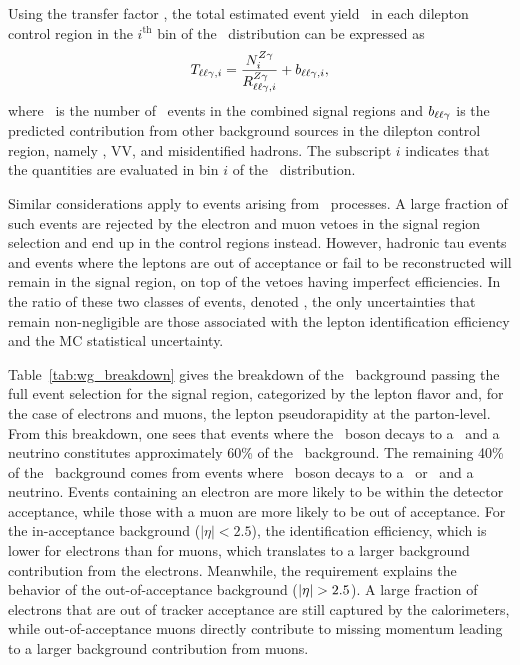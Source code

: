 Using the transfer factor \RZll, the total estimated event yield \Tll\ in each dilepton control region in the $i^\mathrm{th}$ bin of the \ETg\ distribution can be expressed as
\begin{equation}
  \Tll[,i] = \frac{\NZg[i]}{\RZll[,i]} + b_{\ell\ell\Pgg,i},
\end{equation}
where \NZg\ is the number of \zinvg\ events in the combined signal regions and $b_{\ell\ell\Pgg}$ is the predicted contribution from other background sources in the dilepton control region, namely \ttg, VV\Pgg, and misidentified hadrons. 
The subscript $i$ indicates that the quantities are evaluated in bin $i$ of the \ETg\ distribution.

Similar considerations apply to events arising from \wlng\ processes. 
A large fraction of such events are rejected by the electron and muon vetoes in the signal region selection and end up in the control regions instead. 
However, hadronic tau events and events where the leptons are out of acceptance or fail to be reconstructed will remain in the signal region, on top of the vetoes having imperfect efficiencies. 
In the ratio of these two classes of events, denoted \RWl, the only uncertainties that remain non-negligible are those associated with the lepton identification efficiency and the MC statistical uncertainty.

Table~\ref{tab:wg_breakdown} gives the breakdown of the \wlng\ background passing the full event selection for the signal region, categorized by the lepton flavor and, for the case of electrons and muons, the lepton pseudorapidity at the parton-level. 
From this breakdown, one sees that events where the \PW\ boson decays to a \Pgt\ and a neutrino constitutes approximately 60\% of the \wlng\ background. 
The remaining 40\% of the \wlng\ background comes from events where \PW\ boson decays to a \Pgm\ or \Pe\ and a neutrino.
Events containing an electron are more likely to be within the detector acceptance, while those with a muon are more likely to be out of acceptance.
For the in-acceptance background ($|\eta| < 2.5$), the identification efficiency, which is lower for electrons than for muons, which translates to a larger background contribution from the electrons. 
Meanwhile, the \met requirement explains the behavior of the out-of-acceptance background ($\abs\eta > 2.5$).
A large fraction of electrons that are out of tracker acceptance are still captured by the calorimeters, while out-of-acceptance muons directly contribute to missing momentum leading to a larger background contribution from muons.

